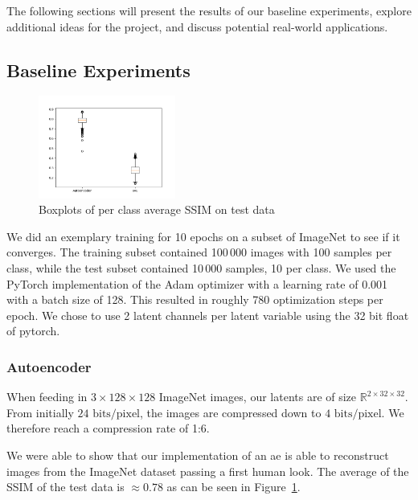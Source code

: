 The following sections will present the results of our baseline experiments, explore additional ideas for the project, and discuss potential real-world applications.

\subsection{Baseline Experiments}\label{subsec:baseline-results}
\begin{figure}
    \centering
    \includegraphics[width=0.4\textwidth]{../../sample_images/evaluation/boxplot_ae_and_vae}
    \vspace{-20pt}
    \caption{Boxplots of per class average SSIM on test data}
    \label{fig:boxplots}
\end{figure}

We did an exemplary training for 10 epochs on a subset of ImageNet to see if it converges.
The training subset contained 100\,000 images with 100 samples per class, while the test subset contained 10\,000
samples, 10 per class.
We used the PyTorch implementation of the Adam optimizer with a learning rate of 0.001 with a batch size of 128.
This resulted in roughly 780 optimization steps per epoch.
We chose to use 2 latent channels per latent variable using the 32 bit float of pytorch.

\subsubsection{Autoencoder}\label{subsubsec:autoencoder}
When feeding in $3 \times 128 \times 128$ ImageNet images, our latents are of size $\mathbb{R}^{2\times 32 \times 32}$.
From initially $24\text{ bits/pixel}$, the images are compressed down to $4\text{ bits/pixel}$.
We therefore reach a compression rate of 1:6.

We were able to show that our implementation of an \ac{ae} is able to reconstruct images from the ImageNet dataset
passing a first human look.
The average of the SSIM of the test data is $\approx 0.78$ as can be seen in Figure~\ref{fig:boxplots}.

